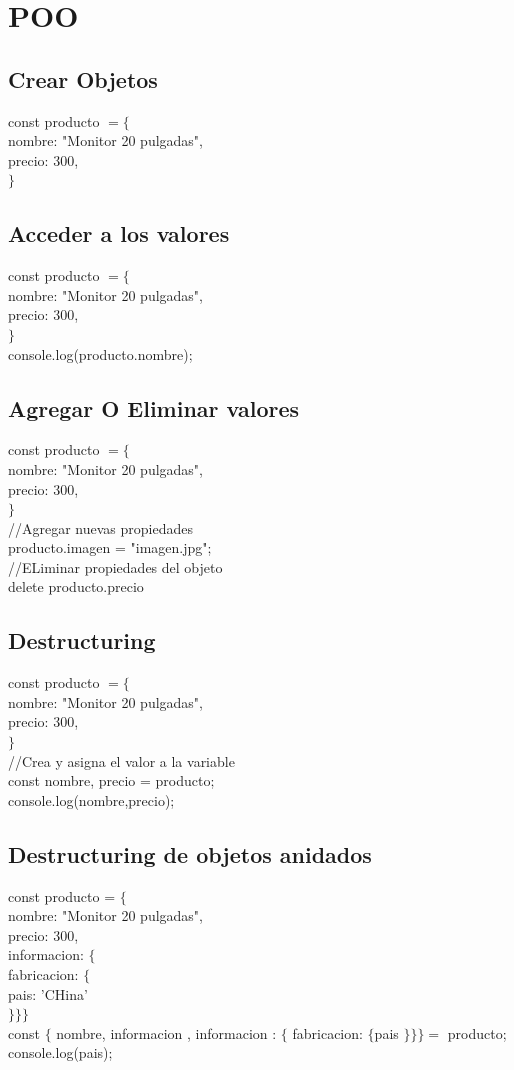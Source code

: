 \documentclass[10pt,a4paper]{article}
\begin{document}
\section{POO}
\subsection{Crear Objetos}
const producto  $ = \{ $  \\ nombre: "Monitor 20 pulgadas", \\ precio: 300, \\  $ \} $ 
\subsection{Acceder a los valores}
const producto  $ = \{ $  \\ nombre: "Monitor 20 pulgadas", \\ precio: 300, \\  $ \} $ \\ 
console.log(producto.nombre);\\
\subsection{Agregar O Eliminar valores} 
const producto  $ = \{ $  \\ nombre: "Monitor 20 pulgadas", \\ precio: 300, \\  $ \} $ \\ 
//Agregar  nuevas propiedades \\
producto.imagen = "imagen.jpg"; \\
//ELiminar propiedades del objeto \\
delete producto.precio \\
\subsection{Destructuring} 
const producto  $ = \{ $  \\ nombre: "Monitor 20 pulgadas", \\ precio: 300, \\  $ \} $ \\ 
//Crea y asigna el valor a la variable \\
const {nombre, precio} = producto; \\
console.log(nombre,precio);\\
\subsection{Destructuring de objetos anidados} 
const producto = $ \{ $ \\ nombre: "Monitor 20 pulgadas", \\ precio: 300, \\ informacion: $ \{ $ \\
fabricacion:  $ \{ $ \\ pais: 'CHina' \\ $ \} \} \}$  \\
const $\{ $ nombre, informacion , informacion : $ \{ $ fabricacion: $ \{ $pais $ \} \} \} = $ producto;\\
console.log(pais);\\
\newpage
\end{document}

